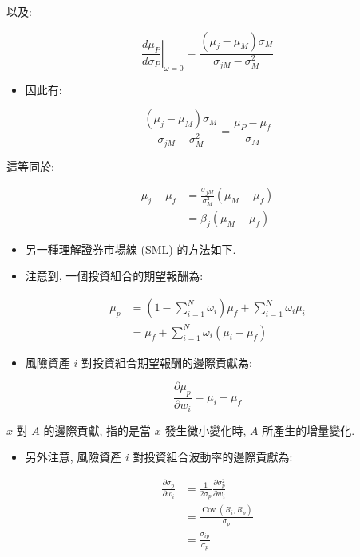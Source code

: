 \documentclass[letterpaper]{article}
\begin{document}
以及: 

$$
\left.\frac{d \mu_{P}}{d \sigma_{P}}\right|_{\omega=0}=\frac{\left (\mu_{j}-\mu_{M}\right) \sigma_{M}}{\sigma_{j M}-\sigma_{M}^{2}}
$$

\begin{itemize}
  \item 因此有: 
\end{itemize}

$$
\frac{\left (\mu_{j}-\mu_{M}\right) \sigma_{M}}{\sigma_{j M}-\sigma_{M}^{2}}=\frac{\mu_{P}-\mu_{f}}{\sigma_{M}}
$$

這等同於: 

$$
\begin{aligned}
\mu_{j}-\mu_{f} & =\frac{\sigma_{j M}}{\sigma_{M}^{2}}\left (\mu_{M}-\mu_{f}\right) \\
& =\beta_{j}\left (\mu_{M}-\mu_{f}\right) 
\end{aligned}
$$

\begin{itemize}
	\item 另一種理解證券市場線 (SML) 的方法如下. 
	\item 注意到, 一個投資組合的期望報酬為: 
\end{itemize}


$$
\begin{aligned}
\mu_{p} & =\left (1-\sum_{i=1}^{N} \omega_{i}\right) \mu_{f}+\sum_{i=1}^{N} \omega_{i} \mu_{i} \\
& =\mu_{f}+\sum_{i=1}^{N} \omega_{i}\left (\mu_{i}-\mu_{f}\right) 
\end{aligned}
$$

\begin{itemize}
	\item 風險資產 $i$ 對投資組合期望報酬的邊際貢獻為: 
\end{itemize}


$$
\frac{\partial \mu_{p}}{\partial w_{i}}=\mu_{i}-\mu_{f}
$$

$x$ 對 $A$ 的邊際貢獻, 指的是當 $x$ 發生微小變化時, $A$ 所產生的增量變化.


\begin{itemize}
	\item 另外注意, 風險資產 $i$ 對投資組合波動率的邊際貢獻為: 
\end{itemize}

$$
\begin{aligned}
\frac{\partial \sigma_{p}}{\partial w_{i}} & =\frac{1}{2 \sigma_{p}} \frac{\partial \sigma_{p}^{2}}{\partial w_{i}} \\
& =\frac{\operatorname{Cov}\left (R_{i}, R_{p}\right) }{\sigma_{p}} \\
& =\frac{\sigma_{i p}}{\sigma_{p}}
\end{aligned}
$$
\end{document}
